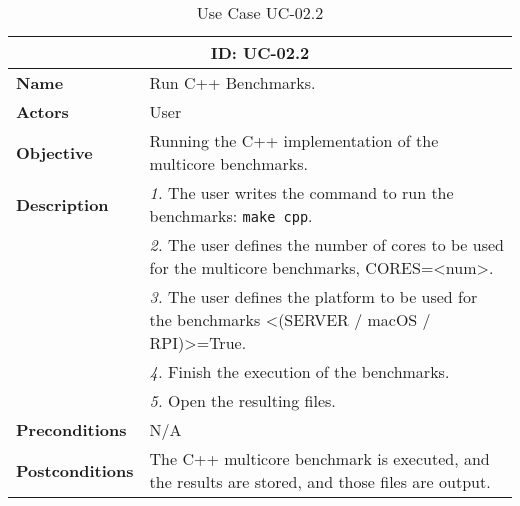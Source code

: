 \begin{table}[H]
    \centering
    \begin{tabular}{l p{10cm}}
        \toprule
        \multicolumn{2}{c}{\textbf{ID: UC-02.2}} \\
        \toprule
        \textbf{Name}                         &  Run C++ Benchmarks. \\
        \textbf{Actors}                       &  User \\
        \textbf{Objective}                    &  Running the C++ implementation of the multicore benchmarks. \\
        \multirow{1}{*}{\textbf{Description}} & \textsl{1.} The user writes the command to run the benchmarks: \texttt{make cpp}.\\
                                              & \textsl{2.} The user defines the number of cores to be used for the multicore benchmarks, CORES=<num>.\\
                                              & \textsl{3.} The user defines the platform to be used for the benchmarks <(SERVER / macOS / RPI)>=True.\\
                                              & \textsl{4.} Finish the execution of the benchmarks.\\
                                              & \textsl{5.} Open the resulting files.\\
        \textbf{Preconditions}                &  N/A \\
        \textbf{Postconditions}               &  The C++ multicore benchmark is executed, and the results are stored, and those files are output. \\
    \end{tabular}
    \caption{Use Case UC-02.2}
    \label{tab:uc-02.2}
\end{table}



